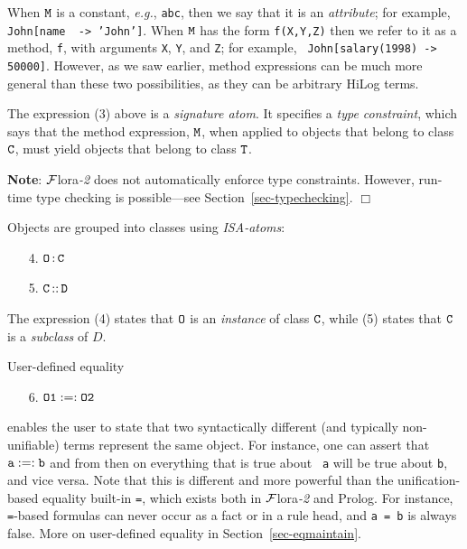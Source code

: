 \documentclass[11pt]{article}
\newcommand{\FLSYSTEM}{{\mbox{\sc ${\cal F}${lora}\rm\emph{-2}}}\xspace}
\newcommand{\isa}{\,{\bf{:}}\,}
\newcommand{\subcl}{\,{\bf{::}}\,}
\newcommand{\mvd}{{\mbox{\tt \,->\,}}}  %
\newcommand{\fl}{\mbox{F-logic}\xspace}
\begin{document}
\begin{itemize}
  When $\tt M$ is a constant, {\it e.g.}, {\tt abc}, then we say that it is
  an \emph{attribute}; for example, {\tt John[name \mvd 'John']}. When $\tt
  M$ has the form {\tt f(X,Y,Z)} then we refer to it as a method, {\tt f},
  with arguments {\tt X}, {\tt Y}, and {\tt Z}; for example, {\tt
  John[salary(1998)\mvd 50000]}.  However, as we saw
  earlier, method expressions can be much more general than these two
  possibilities, as they can be arbitrary HiLog terms.


  \medskip

  \index{signature!in \fl}
  The expression (3) above is a \emph{signature atom}. It specifies a
  \emph{type constraint}, which says
  that the method expression, $\tt M$, when applied to objects that belong
  to class $\tt C$, must yield objects that belong to class $\tt T$.

  \noindent
  {\bf Note}: \FLSYSTEM does not automatically enforce type constraints.
  However, run-time type checking is possible---see
  Section~\ref{sec-typechecking}.
  \hfill$\Box$
  
  \medskip

  Objects are grouped into classes using \emph{ISA-atoms}:
  \medskip

  \begin{enumerate}
  \item[4.] $\tt O\isa C$
  \item[5.] \label{eq-subclass} $\tt C\subcl D$
  \end{enumerate}

  The expression (4) states that $\tt O$ is an \emph{instance} of class $\tt C$,
  while (5) states that $\tt C$ is a \emph{subclass} of $D$.

  User-defined equality
  \begin{enumerate}
    \item[6.] $\tt O1 :=: O2$
  \end{enumerate}
  enables the user to state that two syntactically different (and typically
  non-unifiable) terms represent the same object. For instance, one can
  assert that $\tt a :=: b$ and from then on everything that is true about {\tt
  a}  will be true about {\tt b}, and vice versa. Note that this is
  different and more powerful than the unification-based equality built-in
  {\tt =}, which exists both in \FLSYSTEM and Prolog. For instance, {\tt
  =}-based formulas can never occur as a fact or in a rule head, and {\tt a =
  b} is always false.  More on user-defined equality in
  Section~\ref{sec-eqmaintain}.


\end{itemize}
\end{document}
